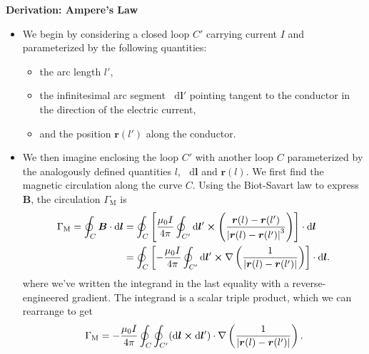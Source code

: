 \documentclass[11pt, a4paper]{article}
\newcommand{\diff}{\mathop{}\!\mathrm{d}} %
\renewcommand{\vec}[1]{\bm{#1}} %
\renewcommand{\r}{\vec{r}}
\newcommand{\B}{\vec{B}} %
\newcommand{\mm}{\mu_{0}}  %
\renewcommand{\grad}{\nabla}
\begin{document}
\textbf{Derivation: Ampere's Law}
\begin{itemize}
	\item We begin by considering a closed loop $ C' $ carrying current $ I $ and parameterized by the following quantities:
    \begin{itemize}
        \item the arc length $ l' $,

        \item the infinitesimal arc segment $ \diff \vec{l}' $ pointing tangent to the conductor in the direction of the electric current,

        \item and the position $ \r(l')  $ along the conductor.
    \end{itemize}

	\item We then imagine enclosing the loop $ C' $ with another  loop $ C $ parameterized by the analogously defined quantities $ l $, $ \diff \vec{l} $ and $ \r(l) $. We first find the magnetic circulation along the curve $ C $. Using the Biot-Savart law to express $ \B $, the circulation $ \Gamma_{\text{M}} $ is
	\begin{align*}
        \Gamma_{\text{M}} = \oint_{C} \B \cdot \diff \vec{l} & = \oint_{C}\left[\frac{\mm I}{4 \pi} \oint_{C'}\diff \vec{l}' \cross \left(\frac{\r(l) - \r(l')}{\abs{\r(l) - \r(l')}^{3}}\right) \right] \cdot \diff \vec{l}\\
        & = \oint_{C}\left[ - \frac{\mm I}{4 \pi} \oint_{C'}\diff \vec{l}' \cross \grad \left(\frac{1}{\abs{\r(l) - \r(l')}}\right) \right] \cdot \diff \vec{l}.
	\end{align*}
	where we've written the integrand in the last equality with a reverse-engineered gradient. The integrand is a scalar triple product, which we can rearrange to get
	\begin{equation*}
		\Gamma_{\text{M}} =  - \frac{\mm I}{4\pi} \oint_{C} \oint_{C'} (\diff \vec{l} \cross \diff \vec{l}') \cdot \grad \left(\frac{1}{\abs{\r(l) - \r(l')}}\right).
	\end{equation*}
	

\end{itemize}
\end{document}
